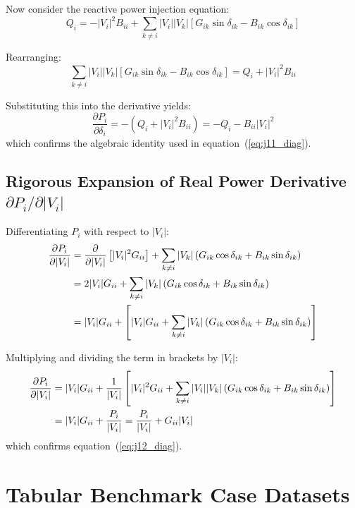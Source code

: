 \documentclass[12pt,a4paper,oneside]{report}
\begin{document}
Now consider the reactive power injection equation:
\begin{equation}
Q_i = -|V_i|^2 B_{ii} + \sum_{k \neq i} |V_i| |V_k| \left[ G_{ik} \sin\delta_{ik} - B_{ik} \cos\delta_{ik} \right]
\end{equation}

Rearranging:
\begin{equation}
\sum_{k \neq i} |V_i| |V_k| \left[ G_{ik} \sin\delta_{ik} - B_{ik} \cos\delta_{ik} \right] = Q_i + |V_i|^2 B_{ii}
\end{equation}

Substituting this into the derivative yields:
\begin{equation}
\frac{\partial P_i}{\partial \delta_i} = - \left( Q_i + |V_i|^2 B_{ii} \right) = -Q_i - B_{ii} |V_i|^2
\end{equation}
which confirms the algebraic identity used in equation~(\ref{eq:j11_diag}).

\section{\texorpdfstring{Rigorous Expansion of Real Power Derivative $\partial P_i / \partial |V_i|$}{Rigorous Expansion of Real Power Derivative dPi / d|Vi|}}
Differentiating $P_i$ with respect to $|V_i|$:
\begin{align}
\frac{\partial P_i}{\partial |V_i|} &= \frac{\partial}{\partial |V_i|} \left[ |V_i|^2 G_{ii} \right] + \sum_{k \neq i} |V_k| \left( G_{ik} \cos\delta_{ik} + B_{ik} \sin\delta_{ik} \right) \notag \\
&= 2 |V_i| G_{ii} + \sum_{k \neq i} |V_k| \left( G_{ik} \cos\delta_{ik} + B_{ik} \sin\delta_{ik} \right) \notag \\
&= |V_i| G_{ii} + \left[ |V_i| G_{ii} + \sum_{k \neq i} |V_k| \left( G_{ik} \cos\delta_{ik} + B_{ik} \sin\delta_{ik} \right) \right]
\end{align}

Multiplying and dividing the term in brackets by $|V_i|$:
\begin{align}
\frac{\partial P_i}{\partial |V_i|} &= |V_i| G_{ii} + \frac{1}{|V_i|} \left[ |V_i|^2 G_{ii} + \sum_{k \neq i} |V_i| |V_k| \left( G_{ik} \cos\delta_{ik} + B_{ik} \sin\delta_{ik} \right) \right] \notag \\
&= |V_i| G_{ii} + \frac{P_i}{|V_i|} = \frac{P_i}{|V_i|} + G_{ii} |V_i|
\end{align}
which confirms equation~(\ref{eq:j12_diag}).

\chapter{Tabular Benchmark Case Datasets}
\end{document}

